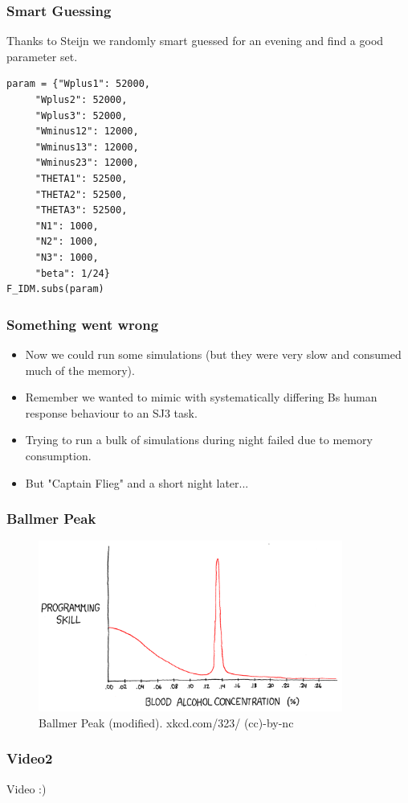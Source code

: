 \documentclass[xcolor={fixpdftex,hyperref,x11names},10pt,pdftex,hyperref={pdftex}]{beamer}
\begin{document}
\begin{frame}[fragile]
  \frametitle{Smart Guessing}
  Thanks to Steijn we randomly smart guessed for an evening and find a good
  parameter set.
  \begin{lstlisting}
param = {"Wplus1": 52000,
     "Wplus2": 52000,
     "Wplus3": 52000,
     "Wminus12": 12000,
     "Wminus13": 12000,
     "Wminus23": 12000,
     "THETA1": 52500,
     "THETA2": 52500,
     "THETA3": 52500,
     "N1": 1000,
     "N2": 1000,
     "N3": 1000,
     "beta": 1/24}
F_IDM.subs(param)
  \end{lstlisting}
\end{frame}

\begin{frame}
  \frametitle{Something went wrong}
  \begin{itemize}
      \item Now we could run some simulations (but they were very slow and
          consumed much of the memory).
      \item Remember we wanted to mimic with systematically differing Bs
          human response behaviour to an SJ3 task.
      \item Trying to run a bulk of simulations during night failed due to
          memory consumption.
      \item But "Captain Flieg" and a short night later...
  \end{itemize}
\end{frame}

\begin{frame}
  \frametitle{Ballmer Peak}
  \begin{figure}[h]
      \includegraphics[width=100mm]{figs/ballmer_peak_mod.png}
      \caption{Ballmer Peak (modified). xkcd.com/323/ (cc)-by-nc}
  \end{figure}
\end{frame}

\begin{frame}
  \frametitle{Video2}
  Video :)
\end{frame}
\end{document}
